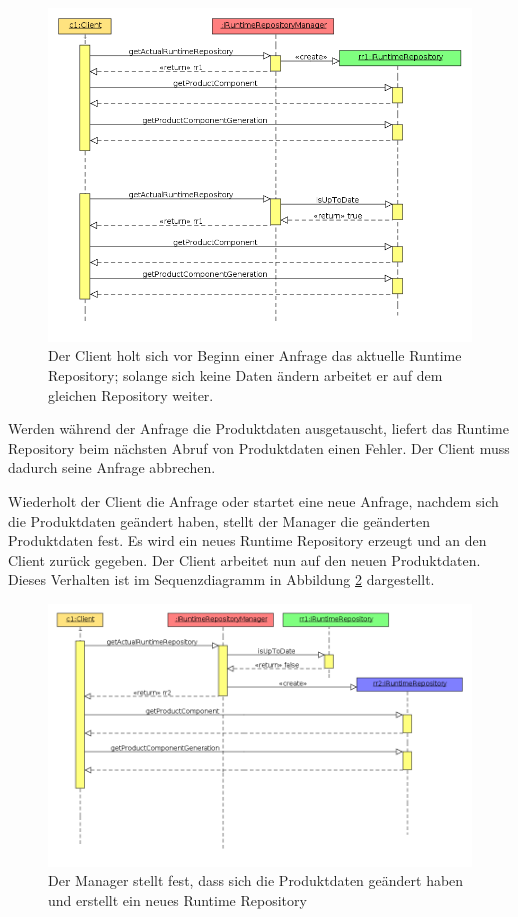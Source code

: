 \documentclass[headsepline=true, footsepline=true]{scrartcl}
\begin{document}
\begin{figure}[htb] \centering
\includegraphics[width=13cm]{./pics/clientSequenceEasy.png} \caption{Der Client
holt sich vor Beginn einer Anfrage das aktuelle Runtime Repository; solange sich
keine Daten ändern arbeitet er auf dem gleichen Repository weiter.}
\label{clientSequenceEasy}
\end{figure}

Werden während der Anfrage die Produktdaten ausgetauscht, liefert das Runtime
Repository beim nächsten Abruf von Produktdaten einen Fehler. Der Client muss
dadurch seine Anfrage abbrechen.

Wiederholt der Client die Anfrage oder startet eine neue Anfrage, nachdem sich
die Produktdaten geändert haben, stellt der Manager die geänderten Produktdaten
fest. Es wird ein neues Runtime Repository erzeugt und an den Client zurück
gegeben. Der Client arbeitet nun auf den neuen Produktdaten. Dieses Verhalten ist
im Sequenzdiagramm in Abbildung \ref{clientSequenceChange} dargestellt.

\begin{figure}[htb] \centering
\includegraphics[width=\textwidth]{./pics/clientSequenceChange.png} \caption{Der
Manager stellt fest, dass sich die Produktdaten geändert haben und erstellt ein
neues Runtime Repository}
\label{clientSequenceChange}
\end{figure}
\end{document}
